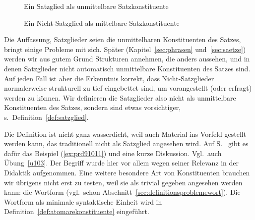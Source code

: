 \begin{figure}[!htbp]
  \centering
  \caption{Ein Satzglied als unmittelbare Satzkonstituente}
  \label{fig:unmittelbarekonstituente}
\end{figure}

\begin{figure}[!htbp]
  \centering
  \caption{Ein Nicht-Satzglied als mittelbare Satzkonstituente}
  \label{fig:mittelbarekonstituente}
\end{figure}

Die Auffassung, Satzglieder seien die unmittelbaren Konstituenten des Satzes, bringt einige Probleme mit sich.
Später (Kapitel~\ref{sec:phrasen} und~\ref{sec:saetze}) werden wir aus gutem Grund Strukturen annehmen, die anders aussehen, und in denen Satzglieder nicht automatisch unmittelbare Konstituenten des Satzes sind.
Auf jeden Fall ist aber die Erkenntnis korrekt, dass Nicht-Satzglieder normalerweise strukturell zu tief eingebettet sind, um \zB vorangestellt (oder erfragt) werden zu können.
Wir definieren die Satzglieder also nicht als unmittelbare Konstituenten des Satzes, sondern sind etwas vorsichtiger, s.\ Definition~\ref{def:satzglied}.


Die Definition ist nicht ganz wasserdicht, weil auch Material ins Vorfeld gestellt werden kann, das traditionell nicht als Satzglied angesehen wird.
Auf S.~\pageref{abs:satzgliedfail} gibt es dafür das Beispiel (\ref{ex:prd91011}) und eine kurze Diskussion.
Vgl.\ auch Übung~\ref{u103}.
Der Begriff wurde hier vor allem wegen seiner Relevanz in der Didaktik aufgenommen.
Eine weitere besondere Art von Konstituenten brauchen wir übrigens nicht erst zu testen, weil sie als trivial gegeben angesehen werden kann: die Wortform (vgl.\ schon Abschnitt~\ref{sec:definitionsproblemewort}).
Die Wortform als minimale syntaktische Einheit wird in Definition~\ref{def:atomarekonstituente} eingeführt.

